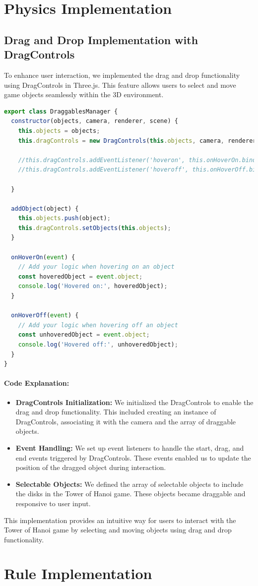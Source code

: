 \documentclass{article}
\begin{document}
\section{Physics Implementation}
\subsection{Drag and Drop Implementation with DragControls}

To enhance user interaction, we implemented the drag and drop functionality using DragControls in Three.js. This feature allows users to select and move game objects seamlessly within the 3D environment.

\begin{lstlisting}[language=JavaScript, caption={JS Class for Drag Control}]
export class DraggablesManager {
  constructor(objects, camera, renderer, scene) {
    this.objects = objects;
    this.dragControls = new DragControls(this.objects, camera, renderer.domElement);

    //this.dragControls.addEventListener('hoveron', this.onHoverOn.bind(this));
    //this.dragControls.addEventListener('hoveroff', this.onHoverOff.bind(this));

  }

  addObject(object) {
    this.objects.push(object);
    this.dragControls.setObjects(this.objects);
  }

  onHoverOn(event) {
    // Add your logic when hovering on an object
    const hoveredObject = event.object;
    console.log('Hovered on:', hoveredObject);
  }

  onHoverOff(event) {
    // Add your logic when hovering off an object
    const unhoveredObject = event.object;
    console.log('Hovered off:', unhoveredObject);
  }
}
\end{lstlisting}

\paragraph{Code Explanation:}

\begin{itemize}
    \item \textbf{DragControls Initialization:} We initialized the DragControls to enable the drag and drop functionality. This included creating an instance of DragControls, associating it with the camera and the array of draggable objects.

    \item \textbf{Event Handling:} We set up event listeners to handle the start, drag, and end events triggered by DragControls. These events enabled us to update the position of the dragged object during interaction.

    \item \textbf{Selectable Objects:} We defined the array of selectable objects to include the disks in the Tower of Hanoi game. These objects became draggable and responsive to user input.

\end{itemize}

This implementation provides an intuitive way for users to interact with the Tower of Hanoi game by selecting and moving objects using drag and drop functionality.


\section{Rule Implementation}
\end{document}
